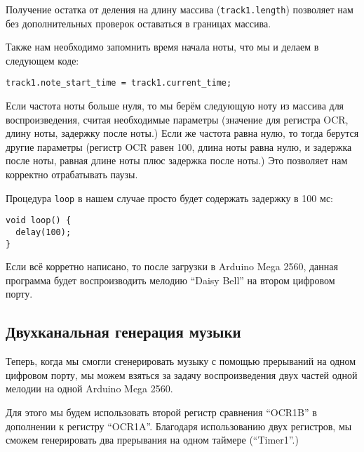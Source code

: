 \documentclass[../sparc.tex]{subfiles}
\begin{document}
Получение остатка от деления на длину массива (\texttt{track1.length})
позволяет нам без дополнительных проверок оставаться в границах массива.

Также нам необходимо запомнить время начала ноты, что мы и делаем в следующем
коде:

\begin{verbatim}
track1.note_start_time = track1.current_time;
\end{verbatim}

Если частота ноты больше нуля, то мы берём следующую ноту из массива для
воспроизведения, считая необходимые параметры (значение для регистра OCR, длину
ноты, задержку после ноты.)  Если же частота равна нулю, то тогда берутся другие
параметры (регистр OCR равен 100, длина ноты равна нулю, и задержка после ноты,
равная длине ноты плюс задержка после ноты.)  Это позволяет нам корректно
отрабатывать паузы.

Процедура \texttt{loop} в нашем случае просто будет содержать задержку
в 100 мс:

\begin{verbatim}
void loop() {
  delay(100);
}
\end{verbatim}

Если всё корретно написано, то после загрузки в Arduino Mega 2560, данная
программа будет воспроизводить мелодию ``Daisy Bell'' на втором цифровом порту.

\subsection{Двухканальная генерация музыки}

Теперь, когда мы смогли сгенерировать музыку с помощью прерываний на одном
цифровом порту, мы можем взяться за задачу воспроизведения двух частей одной
мелодии на одной Arduino Mega 2560.

Для этого мы будем использовать второй регистр сравнения ``OCR1B'' в дополнении
к регистру ``OCR1A''.  Благодаря использованию двух регистров, мы сможем
генерировать два прерывания на одном таймере (``Timer1''.)
\end{document}
